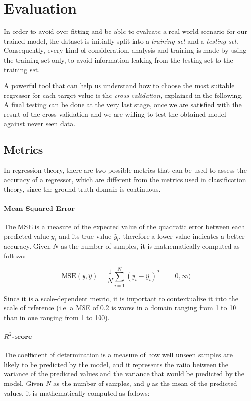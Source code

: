 \section{Evaluation}\label{sec:evaluation}

In order to avoid over-fitting and be able to evaluate a real-world scenario for our trained model, the dataset is initially split into a \emph{training set} and a \emph{testing set}.
Consequently, every kind of consideration, analysis and training is made by using the training set only, to avoid information leaking from the testing set to the training set.

A powerful tool that can help us understand how to choose the most suitable regressor for each target value is the \emph{cross-validation}, explained in the following.
A final testing can be done at the very last stage, once we are satisfied with the result of the cross-validation and we are willing to test the obtained model against never seen data.

\subsection{Metrics}\label{sec:metrics}

In regression theory, there are two possible metrics that can be used to assess the accuracy of a regressor, which are different from the metrics used in classification theory, since the ground truth domain is continuous.

\paragraph{Mean Squared Error}
The MSE is a measure of the expected value of the quadratic error between each predicted value $y_i$ and its true value $\hat{y}_i$, therefore a lower value indicates a better accuracy.
Given $N$ as the number of samples, it is mathematically computed as follows:

\[
	\text{MSE}(y, \hat{y}) = \frac{1}{N} \sum_{i=1}^{N} (y_i - \hat{y}_i)^2
	\qquad [0, \infty)
\]

Since it is a scale-dependent metric, it is important to contextualize it into the scale of reference (i.e. a MSE of 0.2 is worse in a domain ranging from 1 to 10 than in one ranging from 1 to 100).

\paragraph{$R^2$-score}
The coefficient of determination is a measure of how well unseen samples are likely to be predicted by the model, and it represents the ratio between the variance of the predicted values and the variance that would be predicted by the model. Given $N$ as the number of samples, and $\bar{y}$ as the mean of the predicted values, it is mathematically computed as follows:

